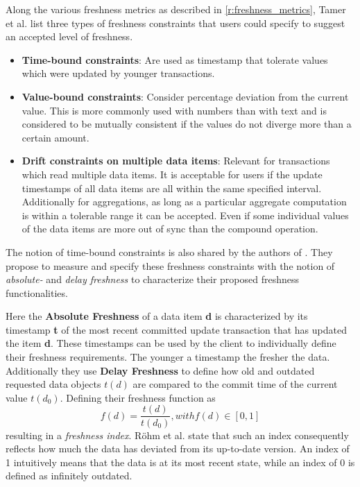 Along the various freshness metrics as described in \ref{r:freshness_metrics}, Tamer et al. \cite{tamer:2005} list three types of freshness constraints that users could specify to
suggest an accepted level of freshness.
\begin{itemize}
    \item \textbf{Time-bound constraints}: Are used as timestamp that tolerate values which were updated by younger transactions. 

    \item \textbf{Value-bound constraints}: Consider percentage deviation from the current value. This is more commonly used with numbers than with text and is considered to
    be mutually consistent if the values do not diverge more than a certain amount.

    \item \textbf{Drift constraints on multiple data items}: Relevant for transactions which read multiple data items. It is acceptable for users if the update timestamps 
    of all data items are all within the same specified interval. Additionally for aggregations, as long as a particular aggregate computation 
    is within a tolerable range it can be accepted. Even if some individual values of the data items are more out of sync than the compound operation.

\end{itemize}

The notion of time-bound constraints is also shared by the authors of \cite{voicu:2010}. They propose to measure and specify these freshness constraints 
with the notion of \emph{absolute-} and \emph{delay freshness} to characterize their proposed freshness functionalities.

Here the \textbf{Absolute Freshness} of a data item \textbf{d} is characterized by its timestamp \textbf{t}
of the most recent committed update transaction that has updated the item \textbf{d}.
These timestamps can be used by the client to individually define their freshness requirements. The younger a timestamp the fresher the data.
Additionally they use \textbf{Delay Freshness} to define how old and outdated requested data objects $t(d)$ are compared to the commit time of the current value $t(d_0)$.
Defining their freshness function as 
\begin{equation}
    f(d) = \frac{t(d)}{t(d_0)}, with f(d) \in [0,1]
\end{equation} 
resulting in a \emph{freshness index}.
Röhm et al. \cite{rohm:2002} state that such an index consequently reflects how much the data has deviated from its up-to-date version.
An index of 1 intuitively means that the data is at its most recent state, while an index of 0 is defined as infinitely outdated.

